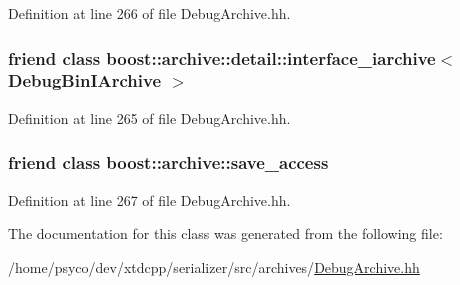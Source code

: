 Definition at line 266 of file Debug\+Archive.\+hh.

\subsubsection[{\texorpdfstring{boost\+::archive\+::detail\+::interface\+\_\+iarchive$<$ Debug\+Bin\+I\+Archive $>$}{boost::archive::detail::interface_iarchive< DebugBinIArchive >}}]{\setlength{\rightskip}{0pt plus 5cm}friend class boost\+::archive\+::detail\+::interface\+\_\+iarchive$<$ {\bf Debug\+Bin\+I\+Archive} $>$\hspace{0.3cm}{\ttfamily [friend]}}\hypertarget{classxtd_1_1serializer_1_1DebugBinIArchive_aace6c76e9b138089c32705b6ec13b0e5}{}\label{classxtd_1_1serializer_1_1DebugBinIArchive_aace6c76e9b138089c32705b6ec13b0e5}


Definition at line 265 of file Debug\+Archive.\+hh.

\subsubsection[{\texorpdfstring{boost\+::archive\+::save\+\_\+access}{boost::archive::save_access}}]{\setlength{\rightskip}{0pt plus 5cm}friend class boost\+::archive\+::save\+\_\+access\hspace{0.3cm}{\ttfamily [friend]}}\hypertarget{classxtd_1_1serializer_1_1DebugBinIArchive_aaca003bb8a4fc59424e4025130da4edd}{}\label{classxtd_1_1serializer_1_1DebugBinIArchive_aaca003bb8a4fc59424e4025130da4edd}


Definition at line 267 of file Debug\+Archive.\+hh.



The documentation for this class was generated from the following file\+:\begin{DoxyCompactItemize}
\item 
/home/psyco/dev/xtdcpp/serializer/src/archives/\hyperlink{DebugArchive_8hh}{Debug\+Archive.\+hh}\end{DoxyCompactItemize}
